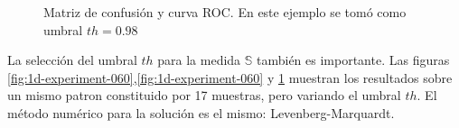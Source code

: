 \begin{figure}
	\centering
	\caption{Matriz de confusión y curva ROC. En este ejemplo se tomó como umbral $th=0.98$} \label{fig:1d-experiment-098}
\end{figure}

La selección del umbral $th$ para la medida $\mathbb{S}$ también es importante.
Las figuras \ref{fig:1d-experiment-060},\ref{fig:1d-experiment-060} y \ref{fig:1d-experiment-098} muestran los resultados 
sobre un mismo patron constituido por 17 muestras, pero variando el umbral $th$. El método numérico para la solución es el
mismo: Levenberg-Marquardt.

